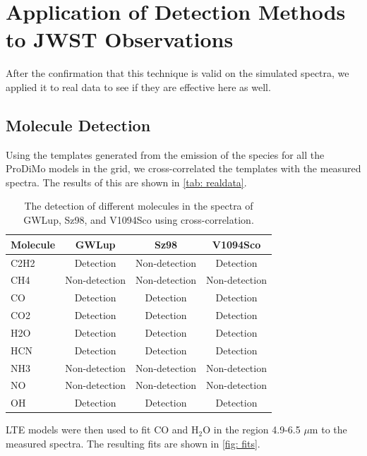 \documentclass[twoside, single, authoryear, semicolon, 12pt]{lion-msc}
\newcommand{\4}{$_4$}
\newcommand{\3}{$_3$}
\newcommand{\2}{$_2$}
\begin{document}
\section{Application of Detection Methods to JWST Observations}
After the confirmation that this technique is valid on the simulated spectra, we applied it to real data to see if they are effective here as well.

\subsection{Molecule Detection}
Using the templates generated from the emission of the species for all the ProDiMo models in the grid, we cross-correlated the templates with the measured spectra. The results of this are shown in \autoref{tab: realdata}.

\begin{table}[!ht]
\centering
\begin{tabular}{|l|ccc|}
\hline
\textbf{Molecule} & \textbf{GWLup} & \textbf{Sz98} & \textbf{V1094Sco} \\ \hline
C2H2            & Detection      & Non-detection & Detection         \\
CH4             & Non-detection  & Non-detection & Non-detection     \\
CO              & Detection      & Detection     & Detection         \\
CO2             & Detection      & Detection     & Detection         \\
H2O             & Detection      & Detection     & Detection         \\
HCN             & Detection      & Detection     & Detection         \\
NH3             & Non-detection  & Non-detection & Non-detection     \\
NO              & Non-detection  & Non-detection & Non-detection     \\
OH              & Detection      & Detection     & Detection         \\ \hline
\end{tabular}

\caption{The detection of different molecules in the spectra of GWLup, Sz98, and V1094Sco using cross-correlation.}
\label{tab: realdata}
\end{table}


LTE models were then used to fit CO and H\2O in the region 4.9-6.5 $\mu$m to the measured spectra. The resulting fits are shown in \autoref{fig: fits}.
\end{document}
